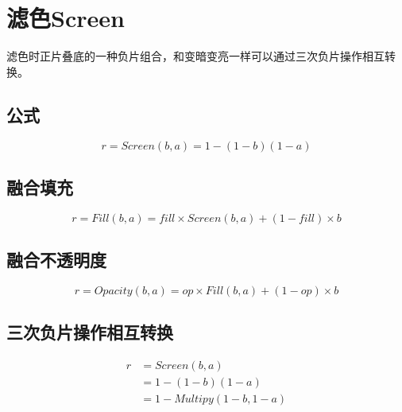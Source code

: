 \newpage
\section{ 滤色Screen}

滤色时正片叠底的一种负片组合，和变暗变亮一样可以通过三次负片操作相互转换。

\subsection{ 公式}


\begin{equation}r=Screen(b,a)=1-(1-b)(1-a)\end{equation}

\subsection{ 融合填充}


\begin{equation}r= Fill(b,a) =fill\times Screen(b,a)+(1-fill)\times b\end{equation}

\subsection{ 融合不透明度}


\begin{equation}r=Opacity(b,a)=op\times Fill(b,a)+(1-op)\times b\end{equation}

\subsection{ 三次负片操作相互转换}


\begin{equation}\begin{aligned}
	r&=Screen(b,a)\\&=1-(1-b)(1-a)\\&= 1 -Multipy(1-b,1-a)
\end{aligned}\end{equation}
\newpage
